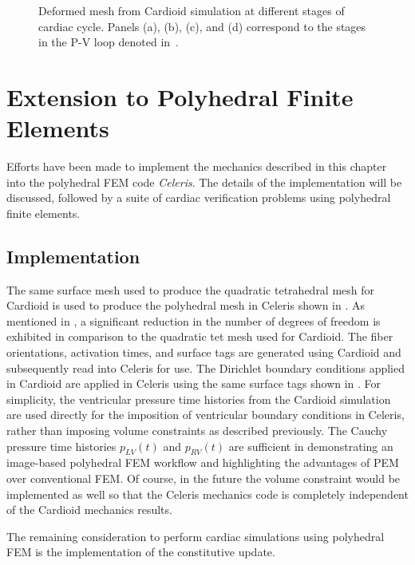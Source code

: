 \begin{figure}
{\label{fig:snaps4}}		
%
\caption{Deformed mesh from Cardioid simulation at different stages of cardiac cycle. Panels (a), (b), (c), and (d) correspond to the stages in the P-V loop denoted in~.}
\label{fig:snaps}
\end{figure}

\section{Extension to Polyhedral Finite Elements}
\label{Polyhedral Finite Elements}

Efforts have been made to implement the mechanics described in this chapter into the polyhedral FEM code \textit{Celeris}. The details of the implementation will be discussed, followed by a suite of cardiac verification problems using polyhedral finite elements.

\subsection{Implementation}

The same surface mesh used to produce the quadratic tetrahedral mesh for Cardioid is used to produce the polyhedral mesh in Celeris shown in . As mentioned in , a significant reduction in the number of degrees of freedom is exhibited in comparison to the quadratic tet mesh used for Cardioid. The fiber orientations, activation times, and surface tags are generated using Cardioid and subsequently read into Celeris for use. The Dirichlet boundary conditions applied in Cardioid are applied in Celeris using the same surface tags shown in . For simplicity, the ventricular pressure time histories from the Cardioid simulation are used directly for the imposition of ventricular boundary conditions in Celeris, rather than imposing volume constraints as described previously. The Cauchy pressure time histories $p_{LV}(t)$ and $p_{RV}(t)$ are sufficient in demonstrating an image-based polyhedral FEM workflow and highlighting the advantages of PEM over conventional FEM. Of course, in the future the volume constraint would be implemented as well so that the Celeris mechanics code is completely independent of the Cardioid mechanics results. 

The remaining consideration to perform cardiac simulations using polyhedral FEM is the implementation of the constitutive update.

